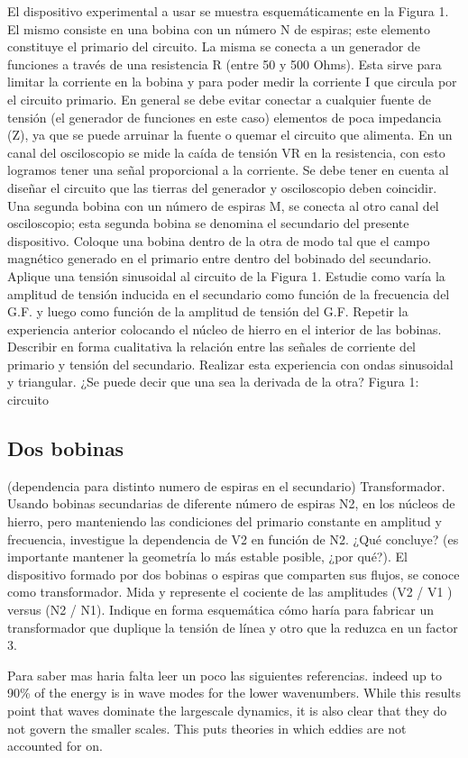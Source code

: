 \documentclass[epj]{svjour}
\begin{document}
El dispositivo experimental a usar se muestra esquemáticamente en la Figura 1. El mismo
consiste en una bobina con un número N de espiras; este elemento constituye el primario del
circuito. La misma se conecta a un generador de funciones a través de una resistencia R (entre 50 y
500 Ohms). Esta sirve para limitar la corriente en la bobina y para poder medir la corriente I que
circula por el circuito primario. En general se debe evitar conectar a cualquier fuente de tensión (el
generador de funciones en este caso) elementos de poca impedancia (Z), ya que se puede
arruinar la fuente o quemar el circuito que alimenta. En un canal del osciloscopio se mide la caída
de tensión VR en la resistencia, con esto logramos tener una señal proporcional a la corriente. Se
debe tener en cuenta al diseñar el circuito que las tierras del generador y osciloscopio deben
coincidir. Una segunda bobina con un número de espiras M, se conecta al otro canal del
osciloscopio; esta segunda bobina se denomina el secundario del presente dispositivo.
Coloque una bobina dentro de la otra de modo tal que el campo magnético generado en el
primario entre dentro del bobinado del secundario. Aplique una tensión sinusoidal al circuito de la
Figura 1. Estudie como varía la amplitud de tensión inducida en el secundario como función de la
frecuencia del G.F. y luego como función de la amplitud de tensión del G.F.
Repetir la experiencia anterior colocando el núcleo de hierro en el interior de las bobinas.
Describir en forma cualitativa la relación entre las señales de corriente del primario y tensión del
secundario. Realizar esta experiencia con ondas sinusoidal y triangular. ¿Se puede decir que una sea
la derivada de la otra?
Figura 1: circuito

\subsection{Dos bobinas}

 (dependencia para distinto numero de espiras en el secundario) Transformador.
 Usando bobinas secundarias de diferente número de espiras N2, en los núcleos de hierro,
pero manteniendo las condiciones del primario constante en amplitud y frecuencia, investigue la
dependencia de V2 en función de N2. ¿Qué concluye? (es importante mantener la geometría lo más
estable posible, ¿por qué?).
El dispositivo formado por dos bobinas o espiras que comparten sus flujos, se conoce como
transformador. Mida y represente el cociente de las amplitudes (V2 / V1 ) versus (N2 / N1). Indique
en forma esquemática cómo haría para fabricar un transformador que duplique la tensión de línea y
otro que la reduzca en un factor 3.


\begin{sabermas}
Para saber mas haria falta leer un poco las siguientes referencias.
indeed up to 90\% of the energy is in wave modes for the lower
wavenumbers. While this results point that waves dominate the largescale
dynamics, it is also clear that they do not govern the smaller scales.
This puts theories in which eddies are not accounted for on.
\end{sabermas}

% 
% 
\end{document}
